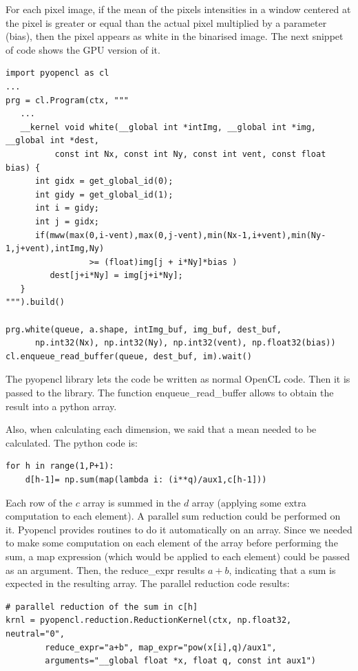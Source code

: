 \documentclass[oneside,a4paper,english,links]{article}
\begin{document}
For each pixel image, if the mean of the pixels intensities in a window centered at the pixel is greater or equal than the actual pixel multiplied by a parameter (bias), then the pixel appears as white in the binarised image. The next snippet of code shows the GPU version of it.

\begin{verbatim}
import pyopencl as cl
...
prg = cl.Program(ctx, """
   ...
   __kernel void white(__global int *intImg, __global int *img, __global int *dest,
          const int Nx, const int Ny, const int vent, const float bias) {
      int gidx = get_global_id(0);
      int gidy = get_global_id(1);
      int i = gidy;
      int j = gidx;
      if(mww(max(0,i-vent),max(0,j-vent),min(Nx-1,i+vent),min(Ny-1,j+vent),intImg,Ny) 
                 >= (float)img[j + i*Ny]*bias )
         dest[j+i*Ny] = img[j+i*Ny];
   }
""").build()

prg.white(queue, a.shape, intImg_buf, img_buf, dest_buf,
      np.int32(Nx), np.int32(Ny), np.int32(vent), np.float32(bias))
cl.enqueue_read_buffer(queue, dest_buf, im).wait()
\end{verbatim}

The pyopencl library lets the code be written as normal OpenCL code. Then it is passed to the library. The function enqueue\_read\_buffer allows to obtain the result into a python array.

Also, when calculating each dimension, we said that a mean needed to be calculated. The python code is:

\begin{verbatim}
for h in range(1,P+1):        
    d[h-1]= np.sum(map(lambda i: (i**q)/aux1,c[h-1]))
\end{verbatim}

Each row of the $c$ array is summed in the $d$ array (applying some extra computation to each element). A parallel sum reduction could be performed on it. Pyopencl provides routines to do it automatically on an array. Since we needed to make some computation on each element of the array before performing the sum, a map expression (which would be applied to each element) could be passed as an argument. Then, the reduce\_expr results $a+b$, indicating that a sum is expected in the resulting array. The parallel reduction code results:


\begin{verbatim}
# parallel reduction of the sum in c[h]
krnl = pyopencl.reduction.ReductionKernel(ctx, np.float32, neutral="0",
        reduce_expr="a+b", map_expr="pow(x[i],q)/aux1",
        arguments="__global float *x, float q, const int aux1")
\end{verbatim}
\end{document}

